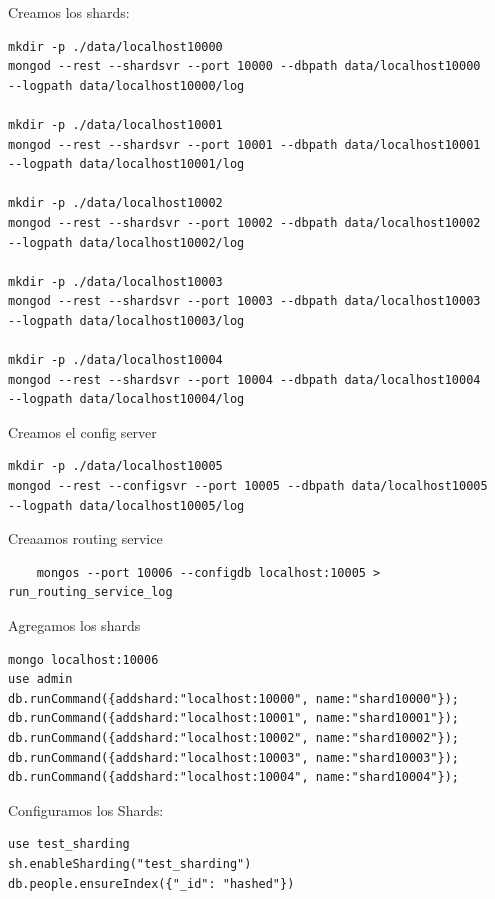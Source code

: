 \documentclass[a4paper, 10pt, twoside]{article}
\begin{document}
Creamos los shards:

\begin{verbatim}
mkdir -p ./data/localhost10000
mongod --rest --shardsvr --port 10000 --dbpath data/localhost10000 
--logpath data/localhost10000/log

mkdir -p ./data/localhost10001
mongod --rest --shardsvr --port 10001 --dbpath data/localhost10001 
--logpath data/localhost10001/log

mkdir -p ./data/localhost10002
mongod --rest --shardsvr --port 10002 --dbpath data/localhost10002 
--logpath data/localhost10002/log

mkdir -p ./data/localhost10003
mongod --rest --shardsvr --port 10003 --dbpath data/localhost10003 
--logpath data/localhost10003/log

mkdir -p ./data/localhost10004
mongod --rest --shardsvr --port 10004 --dbpath data/localhost10004 
--logpath data/localhost10004/log

\end{verbatim}


Creamos el config server 

\begin{verbatim}
mkdir -p ./data/localhost10005
mongod --rest --configsvr --port 10005 --dbpath data/localhost10005 
--logpath data/localhost10005/log
\end{verbatim}

Creaamos routing service

\begin{verbatim}
    mongos --port 10006 --configdb localhost:10005 > run_routing_service_log
\end{verbatim}


Agregamos los shards

\begin{verbatim}
mongo localhost:10006
use admin
db.runCommand({addshard:"localhost:10000", name:"shard10000"});
db.runCommand({addshard:"localhost:10001", name:"shard10001"});
db.runCommand({addshard:"localhost:10002", name:"shard10002"});
db.runCommand({addshard:"localhost:10003", name:"shard10003"});
db.runCommand({addshard:"localhost:10004", name:"shard10004"});
\end{verbatim}

Configuramos los Shards:

\begin{verbatim}
use test_sharding
sh.enableSharding("test_sharding")
db.people.ensureIndex({"_id": "hashed"})
\end{verbatim}
\end{document}

